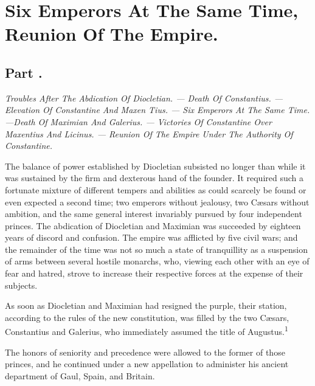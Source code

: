 \chapter{Six Emperors At The Same Time, Reunion Of The Empire.}
\section{Part \thesection.}

\textit{Troubles After The Abdication Of Diocletian. — Death Of
Constantius. — Elevation Of Constantine And Maxen Tius. — Six
Emperors At The Same Time.—Death Of Maximian And
Galerius. — Victories Of Constantine Over Maxentius And
Licinus. — Reunion Of The Empire Under The Authority Of Constantine.}
\vspace{\onelineskip}

The balance of power established by Diocletian subsisted no
longer than while it was sustained by the firm and dexterous hand
of the founder. It required such a fortunate mixture of different
tempers and abilities as could scarcely be found or even expected
a second time; two emperors without jealousy, two Cæsars without
ambition, and the same general interest invariably pursued by
four independent princes. The abdication of Diocletian and
Maximian was succeeded by eighteen years of discord and
confusion. The empire was afflicted by five civil wars; and the
remainder of the time was not so much a state of tranquillity as
a suspension of arms between several hostile monarchs, who,
viewing each other with an eye of fear and hatred, strove to
increase their respective forces at the expense of their
subjects.

As soon as Diocletian and Maximian had resigned the purple, their
station, according to the rules of the new constitution, was
filled by the two Cæsars, Constantius and Galerius, who
immediately assumed the title of Augustus.\textsuperscript{1}


The honors of seniority and precedence were allowed to the former
of those princes, and he continued under a new appellation to
administer his ancient department of Gaul, Spain, and Britain.

